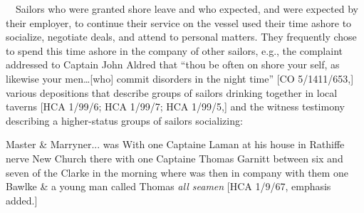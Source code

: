 \begin{styleStandard}
\ \ Sailors who were granted shore leave and who expected, and were expected by their employer, to continue their service on the vessel used their time ashore to socialize, negotiate deals, and attend to personal matters. They frequently chose to spend this time ashore in the company of other sailors, e.g., the complaint addressed to Captain John Aldred that “thou be often on shore your self, as likewise your men…[who] commit disorders in the night time” [CO 5/1411/653,] various depositions that describe groups of sailors drinking together in local taverns [HCA 1/99/6; HCA 1/99/7; HCA 1/99/5,] and the witness testimony describing a higher-status groups of sailors socializing:
\end{styleStandard}

\begin{styleStandard}
Master \& Marryner... was With one Captaine Laman at his house in Rathiffe nerve New Church there with one Captaine Thomas Garnitt between six and seven of the Clarke in the morning where was then in company with them one Bawlke \& a young man called Thomas \textit{all seamen} [HCA 1/9/67, emphasis added.] 
\end{styleStandard}

